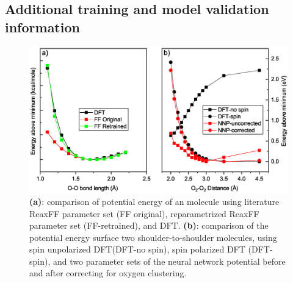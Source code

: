 \documentclass[manuscript=cmatex]{achemso}
\begin{document}
\subsection{Additional training and model validation information}
\begin{figure}[h]
  \centering
  \includegraphics[width=\textwidth]{o2o4}
  \caption[PES of - interaction using DFT and NNP]{\textbf{(a)}: comparison of potential energy of an  molecule using literature ReaxFF parameter set (FF original), reparametrized ReaxFF parameter set (FF-retrained), and DFT. \textbf{(b)}: comparison of the potential energy surface two shoulder-to-shoulder  molecules, using spin unpolarized DFT(DFT-no spin), spin polarized DFT (DFT-spin), and two parameter sets of the neural network potential before and after correcting for oxygen clustering.}
  \label{fig:o4}
\end{figure}

\end{document}
